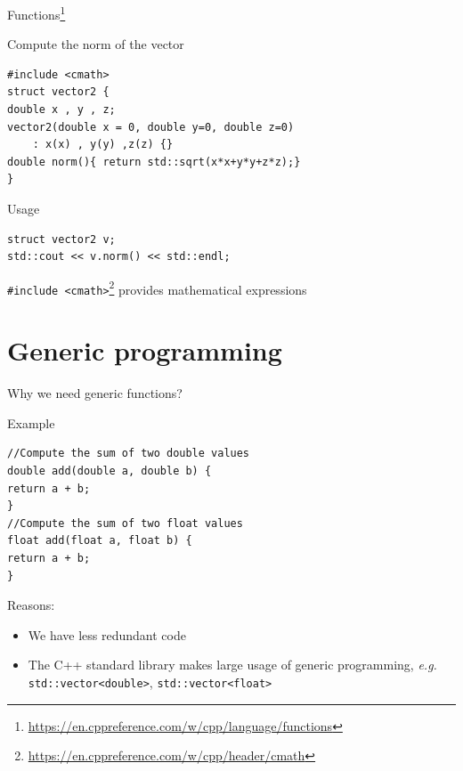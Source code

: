 \documentclass[\classoption]{beamer}
\begin{document}
\begin{frame}[fragile]{Functions\footnote{\tiny\url{https://en.cppreference.com/w/cpp/language/functions}}}
\begin{block}{Compute the norm of the vector}
\begin{lstlisting}
#include <cmath>
struct vector2 {
double x , y , z;
vector2(double x = 0, double y=0, double z=0)
	: x(x) , y(y) ,z(z) {}
double norm(){ return std::sqrt(x*x+y*y+z*z);}
}
\end{lstlisting}
\end{block}
\vspace{-0.25cm}
\begin{block}{Usage}
\begin{lstlisting}
struct vector2 v;
std::cout << v.norm() << std::endl;
\end{lstlisting}
\end{block}
\lstinline|#include <cmath>|\footnote{\tiny\url{https://en.cppreference.com/w/cpp/header/cmath}} provides mathematical expressions
\end{frame}

\section{Generic programming}

\begin{frame}[fragile]{Why we need generic functions?}

\begin{block}{Example}
\begin{lstlisting}
//Compute the sum of two double values
double add(double a, double b) {
return a + b;
}
//Compute the sum of two float values
float add(float a, float b) {
return a + b;
}
\end{lstlisting}
\end{block}

\begin{block}{Reasons:}
\begin{itemize}
\item We have less redundant code
\item The C++ standard library makes large usage of generic programming, \emph{e.g.} \lstinline|std::vector<double>|, \lstinline|std::vector<float>|
\end{itemize}
\end{block}

\end{frame}
\end{document}
